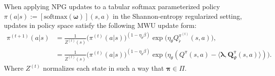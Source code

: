\begin{lemma}
    \label{lem:MWU_Step}
    When applying NPG updates to a tabular softmax parameterized policy $\pi(a|s) := [\text{softmax}(\bm{\omega})](s,a)$ in the Shannon-entropy regularized setting, updates in policy space satisfy the following MWU  update form:
    \begin{align*}
        \pi^{(t+1)}(a|s) 
        &= \frac{1}{Z^{(t)}(s)}\big(\pi^{(t)}(a|s)\big)^{(1-\eta_\theta \beta)} \exp\bigl( \eta_\theta Q_{\tilde{r}}^{\pi^{(t)}} (s,a)  \bigr), \\
        &= \frac{1}{Z^{(t)}(s)}\big(\pi^{(t)}(a|s)\big)^{(1-\eta_\theta \beta)} \exp\bigl( \eta_\theta(Q^\pi(s,a) - \langle \bm{\lambda}, \bm{Q}_\Psi^\pi(s,a) \rangle )  \bigr).
    \end{align*}
    Where $Z^(t)$ normalizes each state in such a way that $\bm{\pi}\in\Pi$.
\end{lemma}
